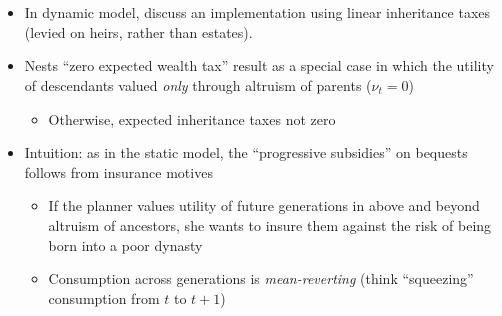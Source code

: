 \documentclass[11pt]{article}
\begin{document}
\section{\cite{farhi2010progressive}}
\begin{itemize}
    \item In dynamic model, \cite{farhi2010progressive} discuss an implementation using linear inheritance taxes (levied on heirs, rather than estates). 
    \item Nests \cite{kocherlakota2005zero} ``zero expected wealth tax'' result as a special case in which the utility of descendants valued \textit{only} through altruism of parents (\( \nu_t = 0 \))
    \begin{itemize}
        \item Otherwise, expected inheritance taxes not zero 
    \end{itemize}
    \item Intuition: as in the static model, the ``progressive subsidies'' on bequests follows from insurance motives 
    \begin{itemize}
        \item If the planner values utility of future generations in above and beyond altruism of ancestors, she wants to insure them against the risk of being born into a poor dynasty 
        \item Consumption across generations is \textit{mean-reverting} (think ``squeezing'' consumption from \( t \) to \( t+1 \))
    \end{itemize}
\end{itemize}
\end{document}
